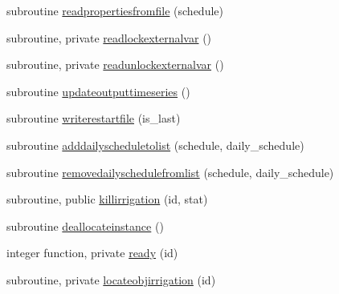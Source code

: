 \begin{DoxyCompactItemize}
\item 
subroutine \mbox{\hyperlink{namespacemoduleirrigation_ad1b1ec0e0230931e65e80ed64cb0fa86}{readpropertiesfromfile}} (schedule)
\item 
subroutine, private \mbox{\hyperlink{namespacemoduleirrigation_a70eefa9249ea662d2b9debe983aee68e}{readlockexternalvar}} ()
\item 
subroutine, private \mbox{\hyperlink{namespacemoduleirrigation_aec61adf79fc09c9fdc6f2f4a521e6549}{readunlockexternalvar}} ()
\item 
subroutine \mbox{\hyperlink{namespacemoduleirrigation_af7ed2c0b32e93ac914c21fd4aa075fb6}{updateoutputtimeseries}} ()
\item 
subroutine \mbox{\hyperlink{namespacemoduleirrigation_ae415b72207ef4095b22ebc9437d78482}{writerestartfile}} (is\+\_\+last)
\item 
subroutine \mbox{\hyperlink{namespacemoduleirrigation_acc9d2d1967203bbf775af6570c0abd70}{adddailyscheduletolist}} (schedule, daily\+\_\+schedule)
\item 
subroutine \mbox{\hyperlink{namespacemoduleirrigation_ac485f39127c7b84771cf5b8e2a64e5d7}{removedailyschedulefromlist}} (schedule, daily\+\_\+schedule)
\item 
subroutine, public \mbox{\hyperlink{namespacemoduleirrigation_acef69ff6504c99d5478be81efeab79fe}{killirrigation}} (id, stat)
\item 
subroutine \mbox{\hyperlink{namespacemoduleirrigation_a01348df0fa0c9f40c6462d69d05b875b}{deallocateinstance}} ()
\item 
integer function, private \mbox{\hyperlink{namespacemoduleirrigation_afbdbea5850d2436e5bbe8f9fb8da65bd}{ready}} (id)
\item 
subroutine, private \mbox{\hyperlink{namespacemoduleirrigation_ae56505ddeb0553538b6cc26774184d2a}{locateobjirrigation}} (id)
\end{DoxyCompactItemize}
